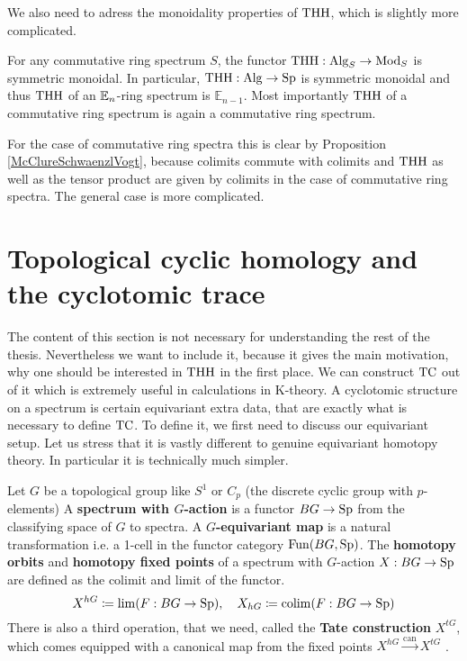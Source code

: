 We also need to adress the monoidality properties of $\operatorname{THH}$, which is slightly more complicated.
\begin{prop}
    For any commutative ring spectrum $S$, the functor $\operatorname{THH}: \operatorname{Alg}_S\rightarrow \operatorname{Mod}_S$ is symmetric monoidal. In particular, $\operatorname{THH}:\operatorname{Alg}\to \operatorname{Sp}$ is symmetric monoidal and thus $\operatorname{THH}$ of an $\mathbb{E}_n$-ring spectrum is $\mathbb{E}_{n-1}$. Most importantly $\operatorname{THH}$ of a commutative ring spectrum is again a commutative ring spectrum.
\end{prop}
For the case of commutative ring spectra this is clear by Proposition \ref{McClureSchwaenzlVogt}, because colimits commute with colimits and $\operatorname{THH}$ as well as the tensor product are given by colimits in the case of commutative ring spectra. The general case is more complicated.

\section{Topological cyclic homology and the cyclotomic trace} \label{TC}
The content of this section is not necessary for understanding the rest of the thesis. Nevertheless we want to include it, because it gives the main motivation, why one should be interested in $\operatorname{THH}$ in the first place. We can construct $\operatorname{TC}$ out of it which is extremely useful in calculations in K-theory.
A cyclotomic structure on a spectrum is certain equivariant extra data, that are exactly what is necessary to define $\operatorname{TC}$.
To define it, we first need to discuss our equivariant setup. Let us stress that it is vastly different to genuine equivariant homotopy theory. In particular it is technically much simpler.
\begin{defn}
    Let $G$ be a topological group like $S^1$ or $C_p$ (the discrete cyclic group with $p$-elements) 
    A \textbf{spectrum with $G$-action} is a functor $BG\to \operatorname{Sp}$ from the classifying space of $G$ to spectra. A \textbf{$G$-equivariant map} is a natural transformation i.e. a 1-cell in the functor category $\operatorname{Fun}(BG,\operatorname{Sp})$. The \textbf{homotopy orbits} and \textbf{homotopy fixed points} of a spectrum with $G$-action $X:BG\to \operatorname{Sp}$ are defined as the colimit and limit of the functor.
    \begin{equation*}
        X^{hG}\coloneqq \lim(F:BG\to \operatorname{Sp}),\quad X_{hG}\coloneqq \operatorname{colim}(F:BG\to \operatorname{Sp})
    \end{equation*}
    There is also a third operation, that we need, called the \textbf{Tate construction} $X^{tG}$, which comes equipped with a canonical map from the fixed points $X^{hG}\xrightarrow{\mathrm{can}}X^{tG}$ . 
\end{defn}

